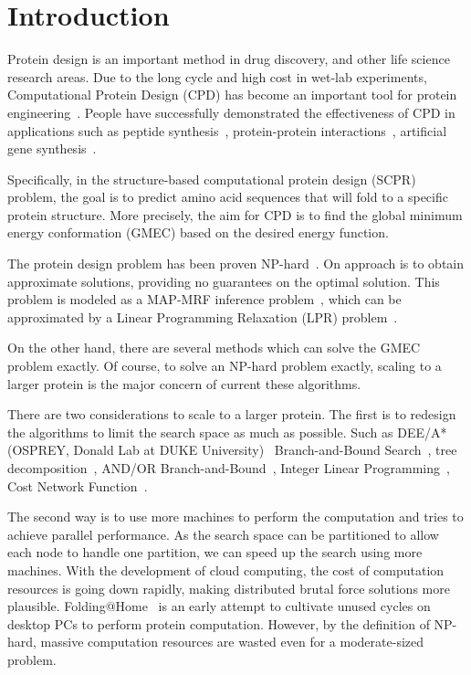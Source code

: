 \section{Introduction}

Protein design is an important method in drug discovery,  and other life science research areas. Due to the long cycle and high cost in wet-lab experiments, Computational Protein Design (CPD) has become an important tool for protein engineering~\cite[]{alvizo2007computational}. People have successfully demonstrated the effectiveness of CPD in applications such as peptide synthesis~\cite[]{ottl1996design}, protein-protein interactions~\cite[]{roberts2012computational}, artificial gene synthesis~\cite[]{villalobos2006gene}.

 Specifically, in the structure-based computational protein design (SCPR) problem, the goal is to predict amino acid sequences that will fold to a specific protein structure. More precisely, the aim for CPD is to find the global minimum energy conformation (GMEC) based on the desired energy function.

The protein design problem has been proven NP-hard~\cite[]{pierce2002protein}. On approach is to obtain approximate solutions, providing no guarantees on the optimal solution. This problem is modeled as a MAP-MRF inference problem~\cite[]{yanover2006linear}, which can be approximated by a Linear Programming Relaxation (LPR) problem~\cite[]{wainwright2005map}.

On the other hand, there are several methods which can solve the GMEC problem exactly. Of course, to solve an NP-hard problem exactly, scaling to a larger protein is the major concern of current these algorithms.

There are two considerations to scale to a larger protein. The first is to redesign the algorithms to limit the search space as much as possible. Such as DEE/A* (OSPREY, Donald Lab at DUKE University)~ Branch-and-Bound Search~\cite[]{hong2006protein}, tree decomposition~\cite[]{xu2006fast}, AND/OR Branch-and-Bound~\cite[]{marinescu2009and}, Integer Linear Programming~\cite[]{kingsford2005solving}, Cost Network Function~\cite[]{traore2013new}.

The second way is to use more machines to perform the computation and tries to achieve parallel performance. As the search space can be partitioned to allow each node to handle one partition, we can speed up the search using more machines. With the development of cloud computing, the cost of computation resources is going down rapidly, making distributed brutal force solutions more plausible. Folding@Home~\cite{} is an early attempt to cultivate unused cycles on desktop PCs to perform protein computation. However, by the definition of NP-hard, massive computation resources are wasted even for a moderate-sized problem.

